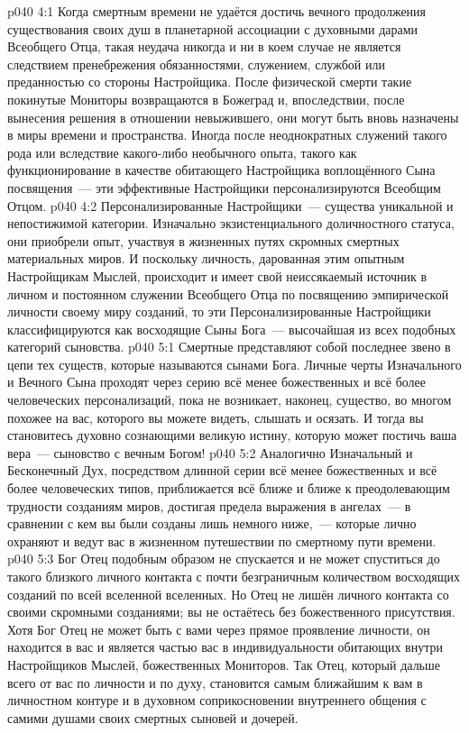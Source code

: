 \vs p040 4:1 Когда смертным времени не удаётся достичь вечного продолжения существования своих душ в планетарной ассоциации с духовными дарами Всеобщего Отца, такая неудача никогда и ни в коем случае не является следствием пренебрежения обязанностями, служением, службой или преданностью со стороны Настройщика. После физической смерти такие покинутые Мониторы возвращаются в Божеград и, впоследствии, после вынесения решения в отношении невыжившего, они могут быть вновь назначены в миры времени и пространства. Иногда после неоднократных служений такого рода или вследствие какого\hyp{}либо необычного опыта, такого как функционирование в качестве обитающего Настройщика воплощённого Сына посвящения~--- эти эффективные Настройщики персонализируются Всеобщим Отцом.
\vs p040 4:2 Персонализированные Настройщики~--- существа уникальной и непостижимой категории. Изначально экзистенциального доличностного статуса, они приобрели опыт, участвуя в жизненных путях скромных смертных материальных миров. И поскольку личность, дарованная этим опытным Настройщикам Мыслей, происходит и имеет свой неиссякаемый источник в личном и постоянном служении Всеобщего Отца по посвящению эмпирической личности своему миру созданий, то эти Персонализированные Настройщики классифицируются как восходящие Сыны Бога~--- высочайшая из всех подобных категорий сыновства.
\vs p040 5:1 Смертные представляют собой последнее звено в цепи тех существ, которые называются сынами Бога. Личные черты Изначального и Вечного Сына проходят через серию всё менее божественных и всё более человеческих персонализаций, пока не возникает, наконец, существо, во многом похожее на вас, которого вы можете видеть, слышать и осязать. И тогда вы становитесь духовно сознающими великую истину, которую может постичь ваша вера~--- сыновство с вечным Богом!
\vs p040 5:2 Аналогично Изначальный и Бесконечный Дух, посредством длинной серии всё менее божественных и всё более человеческих типов, приближается всё ближе и ближе к преодолевающим трудности созданиям миров, достигая предела выражения в ангелах~--- в сравнении с кем вы были созданы лишь немного ниже,~--- которые лично охраняют и ведут вас в жизненном путешествии по смертному пути времени.
\vs p040 5:3 Бог Отец подобным образом не спускается и не может спуститься до такого близкого личного контакта с почти безграничным количеством восходящих созданий по всей вселенной вселенных. Но Отец не лишён личного контакта со своими скромными созданиями; вы не остаётесь без божественного присутствия. Хотя Бог Отец не может быть с вами через прямое проявление личности, он находится в вас и является частью вас в индивидуальности обитающих внутри Настройщиков Мыслей, божественных Мониторов. Так Отец, который дальше всего от вас по личности и по духу, становится самым ближайшим к вам в личностном контуре и в духовном соприкосновении внутреннего общения с самими душами своих смертных сыновей и дочерей.
